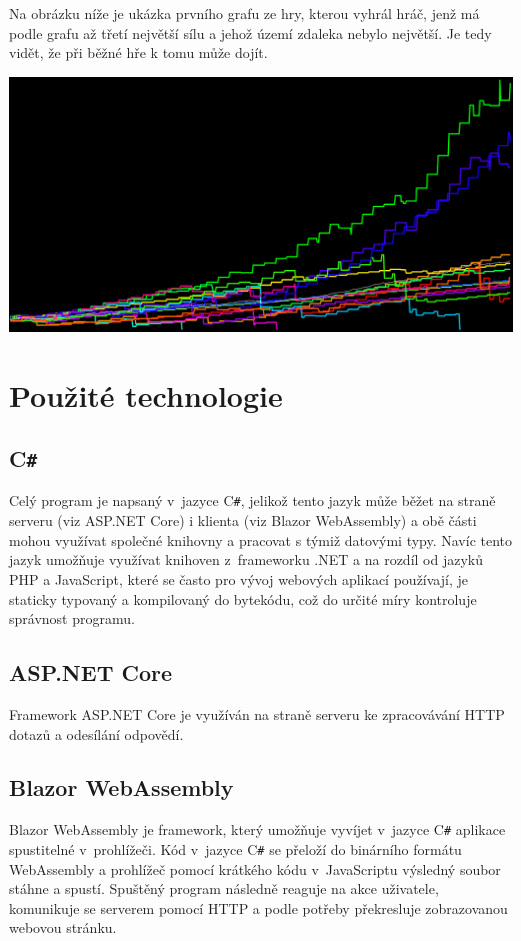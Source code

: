 \documentclass[a4paper,12pt]{article}
\def\CS{C\texttt{\#}}
\begin{document}
Na obrázku níže je ukázka prvního grafu ze hry, kterou vyhrál hráč, jenž má podle grafu až třetí největší sílu a jehož území zdaleka nebylo největší. Je tedy vidět, že při běžné hře k tomu může dojít.

\includegraphics[width=\textwidth]{PowersGraph.png}

\section{Použité technologie}
\subsection{\CS{}}
Celý program je napsaný v~jazyce \CS{}, jelikož tento jazyk může běžet na straně serveru (viz ASP.NET Core) i klienta (viz Blazor WebAssembly) a obě části mohou využívat společné knihovny a pracovat s týmiž datovými typy. Navíc tento jazyk umožňuje využívat knihoven z~frameworku .NET a na rozdíl od jazyků PHP a JavaScript, které se často pro vývoj webových aplikací používají, je staticky typovaný a kompilovaný do bytekódu, což do určité míry kontroluje správnost programu.
\subsection{ASP.NET Core}
Framework ASP.NET Core je využíván na straně serveru ke zpracovávání HTTP dotazů a odesílání odpovědí.
\subsection{Blazor WebAssembly}
Blazor WebAssembly je framework, který umožňuje vyvíjet v~jazyce \CS{} aplikace spustitelné v~prohlížeči. Kód v~jazyce \CS{} se přeloží do binárního formátu WebAssembly a prohlížeč pomocí krátkého kódu v~JavaScriptu výsledný soubor stáhne a spustí. Spuštěný program následně reaguje na akce uživatele, komunikuje se serverem pomocí HTTP a podle potřeby překresluje zobrazovanou webovou stránku.
\end{document}
